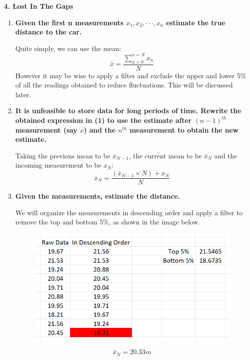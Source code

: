\documentclass[a4paper, 12pt]{exam}
\newcommand{\tripdot}{\cdot \cdot \cdot}
\begin{document}
		{\large \textbf{4. Lost In The Gaps}}
		\begin{enumerate}
			\item \textbf{Given the first n measurements ${x_1, x_2,\tripdot, x_n}$ estimate the true distance to the car.}
			
			Quite simply, we can use the mean:
			\begin{equation}
				\bar{x} = \frac{\sum_{n = 0}^{n = N}x_n}{N}
			\end{equation}
			However it may be wise to apply a filter and exclude the upper and lower 5\% of all the readings obtained to reduce fluctuations. This will be discussed later.
			
			\item \textbf{It is unfeasible to store data for long periods of time. Rewrite the obtained expression in (1) to use the estimate after $(n-1)^{th}$ measurement (say $x$) and the $n^{th}$ measurement to obtain the new estimate.}
			
			Taking the previous mean to be $\bar{x}_{N-1}$, the current mean to be $\bar{x}_N$ and the incoming measurement to be $x_N$:
			\begin{equation}
				\bar{x}_N = \frac{(\bar{x}_{N-1}\times N)+x_N}{N}
			\end{equation}
			
			\item \textbf{Given the measurements, estimate the distance.}
			
			We will organize the measurements in descending order and apply a filter to remove the top and bottom 5\%, as shown in the image below.
			\begin{figure}[h!]
				\centering
				\includegraphics{ADCS_Q4_Image1}
			\end{figure}
			\begin{equation}
				\bar{x}_N = 20.33 m
			\end{equation}
			

\end{enumerate}
\end{document}
